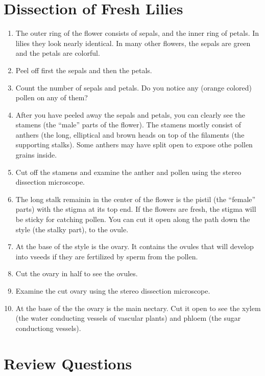 \documentclass[]{book}
\providecommand{\tightlist}{%
  \setlength{\itemsep}{0pt}\setlength{\parskip}{0pt}}
\theoremstyle{definition}
\theoremstyle{definition}
\theoremstyle{definition}
\theoremstyle{remark}
\begin{document}
\section{Dissection of Fresh Lilies}\label{dissection-of-fresh-lilies}

\begin{enumerate}
\def\labelenumi{\arabic{enumi}.}
\tightlist
\item
  The outer ring of the flower consists of sepals, and the inner ring of
  petals. In lilies they look nearly identical. In many other flowers,
  the sepals are green and the petals are colorful.
\item
  Peel off first the sepals and then the petals.
\item
  Count the number of sepals and petals. Do you notice any (orange
  colored) pollen on any of them?
\item
  After you have peeled away the sepals and petals, you can clearly see
  the stamens (the ``male'' parts of the flower). The stamens mostly
  consist of anthers (the long, elliptical and brown heads on top of the
  filaments (the supporting stalks). Some anthers may have split open to
  expose othe pollen grains inside.
\item
  Cut off the stamens and examine the anther and pollen using the stereo
  dissection microscope.
\item
  The long stalk remainin in the center of the flower is the pistil (the
  ``female'' parts) with the stigma at its top end. If the flowers are
  fresh, the stigma will be sticky for catching pollen. You can cut it
  open along the path down the style (the stalky part), to the ovule.
\item
  At the base of the style is the ovary. It contains the ovules that
  will develop into vseeds if they are fertilized by sperm from the
  pollen.
\item
  Cut the ovary in half to see the ovules.
\item
  Examine the cut ovary using the stereo dissection microscope.
\item
  At the base of the the ovary is the main nectary. Cut it open to see
  the xylem (the water conducting vessels of vascular plants) and phloem
  (the sugar conductiong vessels).
\end{enumerate}

\section{Review Questions}\label{review-questions-2}
\end{document}
